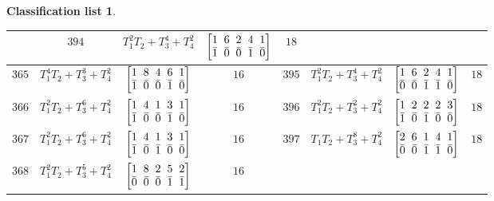 \documentclass[pdftex]{sigma}%
\theoremstyle{definition}
\newtheorem{class-list}[thm]{Classification list}
\numberwithin{equation}{section}
\begin{document}
\begin{class-list}
\begin{table}[h!]
\begin{tabu}{c|c|c|c||c|c|c|c}
&${394}$&${T_{1}^{2}T_{2}+T_{3}^{4}+T_{4}^{2}}$
&$\arraycolsep=1mm\begin{bmatrix}{1} & {6} & {2} & {4} & {1} \\ {\bar{1}} & {\bar{0}} & {\bar{0}} & {\bar{1}} & {\bar{0}}\end{bmatrix}$&${18}$
\\
\hline
${365}$&${T_{1}^{4}T_{2}+T_{3}^{3}+T_{4}^{2}}$
&$\arraycolsep=1mm\begin{bmatrix}{1} & {8} & {4} & {6} & {1} \\ {\bar{1}} & {\bar{0}} & {\bar{0}} & {\bar{1}} & {\bar{0}}\end{bmatrix}$&${16}$
&${395}$&${T_{1}^{2}T_{2}+T_{3}^{4}+T_{4}^{2}}$
&$\arraycolsep=1mm\begin{bmatrix}{1} & {6} & {2} & {4} & {1} \\ {\bar{0}} & {\bar{0}} & {\bar{1}} & {\bar{1}} & {\bar{0}}\end{bmatrix}$&${18}$
\\
\hline
${366}$&${T_{1}^{2}T_{2}+T_{3}^{6}+T_{4}^{2}}$
&$\arraycolsep=1mm\begin{bmatrix}{1} & {4} & {1} & {3} & {1} \\ {\bar{1}} & {\bar{0}} & {\bar{0}} & {\bar{1}} & {\bar{0}}\end{bmatrix}$&${16}$
&${396}$&${T_{1}^{2}T_{2}+T_{3}^{2}+T_{4}^{2}}$
&$\arraycolsep=1mm\begin{bmatrix}{1} & {2} & {2} & {2} & {3} \\ {\bar{1}} & {\bar{0}} & {\bar{1}} & {\bar{0}} & {\bar{0}}\end{bmatrix}$&${18}$
\\
\hline
${367}$&${T_{1}^{2}T_{2}+T_{3}^{6}+T_{4}^{2}}$
&$\arraycolsep=1mm\begin{bmatrix}{1} & {4} & {1} & {3} & {1} \\ {\bar{1}} & {\bar{0}} & {\bar{1}} & {\bar{0}} & {\bar{0}}\end{bmatrix}$&${16}$
&${397}$&${T_{1}T_{2}+T_{3}^{8}+T_{4}^{2}}$
&$\arraycolsep=1mm\begin{bmatrix}{2} & {6} & {1} & {4} & {1} \\ {\bar{0}} & {\bar{0}} & {\bar{1}} & {\bar{1}} & {\bar{0}}\end{bmatrix}$&${18}$
\\
\hline
${368}$&${T_{1}^{2}T_{2}+T_{3}^{5}+T_{4}^{2}}$
&$\arraycolsep=1mm\begin{bmatrix}{1} & {8} & {2} & {5} & {2} \\ {\bar{0}} & {\bar{0}} & {\bar{0}} & {\bar{1}} & {\bar{1}}\end{bmatrix}$&${16}$

\end{tabu}
\end{table}
\end{class-list}
\end{document}
